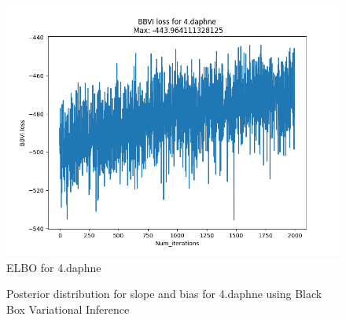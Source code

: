 \documentclass{article}
\begin{document}
\begin{enumerate}
\begin{figure}[!ht]
	\centering
	\includegraphics[scale=0.5]{../figs/4_daphne_ELBO}
	\caption{ELBO for 4.daphne}
\end{figure}

\begin{figure}[!htp] 
    \centering
    \hfill%
        \caption{Posterior distribution for slope and bias for 4.daphne using Black Box Variational Inference}
\end{figure}


\end{enumerate}
\end{document}
